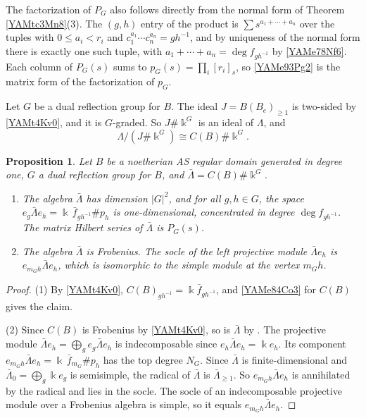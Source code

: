 \documentclass[reqno]{amsart}
\numberwithin{equation}{section}
\newtheorem{proposition}[equation]{Proposition}
\theoremstyle{definition}
\theoremstyle{remark}
\theoremstyle{plain}
\newcommand{\kk}{\Bbbk}
\begin{document}
The factorization of $P_G$ also follows directly from the normal form of Theorem \ref{YAMtc3Mn8}(3). The $(g,h)$ entry of the product is $\sum s^{a_1+\cdots+a_n}$ over the tuples with $0\le a_i<r_i$ and $c_1^{a_1}\cdots c_n^{a_n}=gh^{-1}$, and by uniqueness of the normal form there is exactly one such tuple, with $a_1+\cdots+a_n=\deg f_{gh^{-1}}$ by \eqref{YAMe78Nf6}. Each column of $P_G(s)$ sums to $p_G(s)=\prod_i[r_i]_s$, so \eqref{YAMe93Pg2} is the matrix form of the factorization of $p_G$.

Let $G$ be a dual reflection group for $B$. The ideal $J=B(B_e)_{\ge1}$ is two-sided by \eqref{YAMt4Kv0}, and it is $G$-graded. So $J\#\kk^G$ is an ideal of $\Lambda$, and
\[
\Lambda/(J\#\kk^G)\cong C(B)\#\kk^G.
\]

\begin{proposition}\label{YAMp9Cq3}
Let $B$ be a noetherian AS regular domain generated in degree one, $G$ a dual reflection group for $B$, and $\bar\Lambda=C(B)\#\kk^G$.
\begin{enumerate}
\item The algebra $\bar\Lambda$ has dimension $|G|^2$, and for all $g,h\in G$, the space $e_g\bar\Lambda e_h=\kk\,\bar f_{gh^{-1}}\#p_h$ is one-dimensional, concentrated in degree $\deg f_{gh^{-1}}$. The matrix Hilbert series of $\bar\Lambda$ is $P_G(s)$.
\item The algebra $\bar\Lambda$ is Frobenius. The socle of the left projective module $\bar\Lambda e_h$ is $e_{m_Gh}\bar\Lambda e_h$, which is isomorphic to the simple module at the vertex $m_Gh$.
\end{enumerate}
\end{proposition}

\begin{proof}
(1) By \eqref{YAMt4Kv0}, $C(B)_{gh^{-1}}=\kk\bar f_{gh^{-1}}$, and \eqref{YAMe84Co3} for $C(B)$ gives the claim.

(2) Since $C(B)$ is Frobenius by \eqref{YAMt4Kv0}, so is $\bar\Lambda$ by \cite[Corollary 2.2]{DNN}. The projective module $\bar\Lambda e_h=\bigoplus_ge_g\bar\Lambda e_h$ is indecomposable since $e_h\bar\Lambda e_h=\kk e_h$. Its component $e_{m_Gh}\bar\Lambda e_h=\kk\,\bar f_{m_G}\#p_h$ has the top degree $N_G$. Since $\bar\Lambda$ is finite-dimensional and $\bar\Lambda_0=\bigoplus_g\kk e_g$ is semisimple, the radical of $\bar\Lambda$ is $\bar\Lambda_{\ge1}$. So $e_{m_Gh}\bar\Lambda e_h$ is annihilated by the radical and lies in the socle. The socle of an indecomposable projective module over a Frobenius algebra is simple, so it equals $e_{m_Gh}\bar\Lambda e_h$.
\end{proof}
\end{document}
